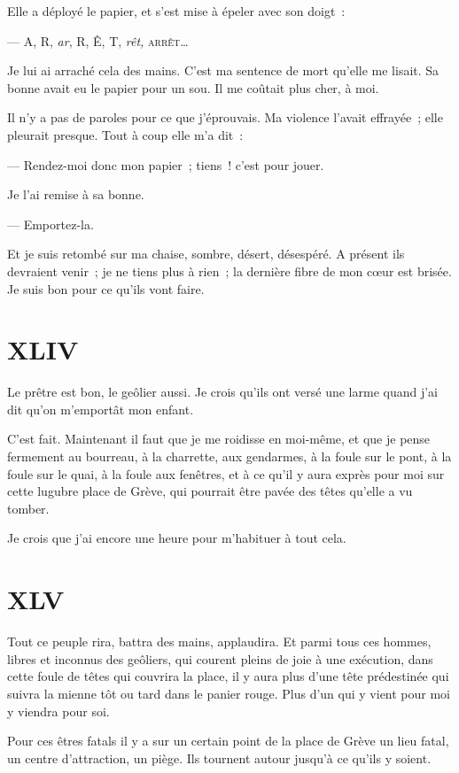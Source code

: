 \documentclass[french,twoside]{book} %
\begin{document}
Elle a déployé le papier, et s’est mise à épeler avec son doigt :\par
— A, R, \emph{ar}, R, Ê, T, \emph{rêt,} {\scshape arrêt}…\par
Je lui ai arraché cela des mains. C’est ma sentence de mort qu’elle me lisait. Sa bonne avait eu le papier pour un sou. Il me coûtait plus cher, à moi.\par
Il n’y a pas de paroles pour ce que j’éprouvais. Ma violence l’avait effrayée ; elle pleurait presque. Tout à coup elle m’a dit :\par
— Rendez-moi donc mon papier ; tiens ! c’est pour jouer.\par
Je l’ai remise à sa bonne.\par
— Emportez-la.\par
Et je suis retombé sur ma chaise, sombre, désert, désespéré. A présent ils devraient venir ; je ne tiens plus à rien ; la dernière fibre de mon cœur est brisée. Je suis bon pour ce qu’ils vont faire.
 \section[{XLIV}]{XLIV}
\label{ch44}\renewcommand{\leftmark}{XLIV}

\noindent Le prêtre est bon, le geôlier aussi. Je crois qu’ils ont versé une larme quand j’ai dit qu’on m’emportât mon enfant.\par
C’est fait. Maintenant il faut que je me roidisse en moi-même, et que je pense fermement au bourreau, à la charrette, aux gendarmes, à la foule sur le pont, à la foule sur le quai, à la foule aux fenêtres, et à ce qu’il y aura exprès pour moi sur cette lugubre place de Grève, qui pourrait être pavée des têtes qu’elle a vu tomber.\par
Je crois que j’ai encore une heure pour m’habituer à tout cela.
 \section[{XLV}]{XLV}
\label{ch45}\renewcommand{\leftmark}{XLV}

\noindent Tout ce peuple rira, battra des mains, applaudira. Et parmi tous ces hommes, libres et inconnus des geôliers, qui courent pleins de joie à une exécution, dans cette foule de têtes qui couvrira la place, il y aura plus d’une tête prédestinée qui suivra la mienne tôt ou tard dans le panier rouge. Plus d’un qui y vient pour moi y viendra pour soi.\par
Pour ces êtres fatals il y a sur un certain point de la place de Grève un lieu fatal, un centre d’attraction, un piège. Ils tournent autour jusqu’à ce qu’ils y soient.
\end{document}
